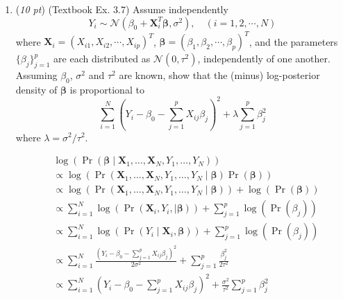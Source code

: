 \documentclass[10pt]{article}
\theoremstyle{definition}
\theoremstyle{remark}
\newcommand{\bX}{\bm{X}}
\newcommand{\bbeta}{\bm{\beta}}
\newcommand{\cN}{\mathcal{N}}
\begin{document}
\begin{enumerate}
	\item (\textit{10 pt}) (Textbook Ex. 3.7) Assume independently
	\[ Y_{i} \sim \cN(\beta_{0} + \bX_{i}^{T}\bbeta, \sigma^{2}), \quad (i=1,2,\cdots,N) \]
	where $ \bX_{i} = (X_{i1},X_{i2},\cdots,X_{ip})^{T} $, $ \bbeta = (\beta_{1},\beta_{2},\cdots,\beta_{p})^{T} $, and the parameters $ \{\beta_{j}\}_{j=1}^{p} $ are each distributed as $ \cN(0,\tau^{2}) $, independently of one another. Assuming $ \beta_{0} $, $ \sigma^{2} $ and $ \tau^{2} $ are known, show that the (minus) log-posterior density of $ \bbeta $ is proportional to
	\[ \sum_{i=1}^{N}\left( Y_{i} - \beta_{0} - \sum_{j=1}^{p}X_{ij}\beta_{j} \right)^{2} + \lambda \sum_{j=1}^{p}\beta_{j}^{2}  \]
	where $ \lambda = \sigma^{2}/\tau^{2} $.
	
	\begin{align*}
	    & \log\left(\Pr(\bbeta\mid \bX_1, \hdots, \bX_N, Y_1, \hdots, Y_N)\right) \\
	    & \propto \log \left( \Pr(\bX_1, \hdots, \bX_N, Y_1, \hdots, Y_N \mid \bbeta) \Pr(\bbeta) \right) \\
	    & \propto \log \left( \Pr(\bX_1, \hdots, \bX_N, Y_1, \hdots, Y_N \mid \bbeta)  \right) + \log \left(\Pr(\bbeta)\right) \\
	    & \propto \sum_{i=1}^{N} \log \left( \Pr(\bX_i, Y_i, \mid \bbeta) \right)+ \sum_{j=1}^p \log \left(\Pr(\beta_j)\right) \\
	    & \propto \sum_{i=1}^{N} \log \left( \Pr(Y_i \mid \bX_i, \bbeta) \right)+ \sum_{j=1}^p \log \left(\Pr(\beta_j)\right) \\
	    & \propto \sum_{i=1}^{N} \frac{\left( Y_{i} - \beta_{0} - \sum_{j=1}^{p}X_{ij}\beta_{j} \right)^{2}}{2\sigma^2} + \sum_{j=1}^p \frac{\beta_j^2}{2\tau^2} \\
	    & \propto \sum_{i=1}^{N} \left( Y_{i} - \beta_{0} - \sum_{j=1}^{p}X_{ij}\beta_{j} \right)^{2} + \frac{\sigma^2}{\tau^2}  \sum_{j=1}^p \beta_j^2 
	\end{align*}
	

\end{enumerate}
\end{document}
